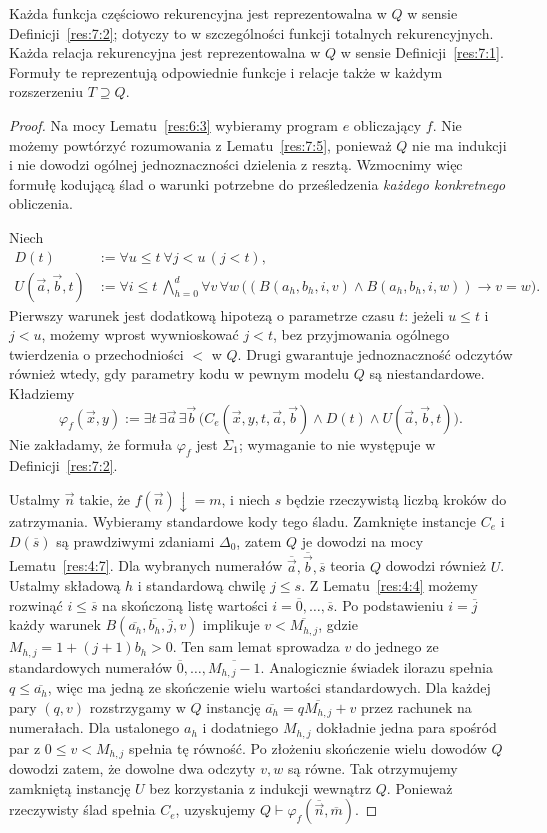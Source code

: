 \begin{twierdzenie}\label{res:7:6}
Każda funkcja częściowo rekurencyjna jest reprezentowalna w $Q$ w sensie Definicji~\ref{res:7:2}; dotyczy to w szczególności funkcji totalnych rekurencyjnych. Każda relacja rekurencyjna jest reprezentowalna w $Q$ w sensie Definicji~\ref{res:7:1}. Formuły te reprezentują odpowiednie funkcje i relacje także w każdym rozszerzeniu $T\supseteq Q$.
\end{twierdzenie}
\begin{proof}
Na mocy Lematu~\ref{res:6:3} wybieramy program $e$ obliczający $f$. Nie możemy powtórzyć rozumowania z Lematu~\ref{res:7:5}, ponieważ $Q$ nie ma indukcji i nie dowodzi ogólnej jednoznaczności dzielenia z resztą. Wzmocnimy więc formułę kodującą ślad o warunki potrzebne do prześledzenia \emph{każdego konkretnego} obliczenia.

Niech
\begin{align*}
D(t)&:=\forall u\le t\ \forall j<u\,(j<t),\\
U(\vec a,\vec b,t)&:=\forall i\le t\ \bigwedge_{h=0}^d\forall v\,\forall w\,
\bigl((B(a_h,b_h,i,v)\land B(a_h,b_h,i,w))\to v=w\bigr).
\end{align*}
Pierwszy warunek jest dodatkową hipotezą o parametrze czasu $t$:
jeżeli $u\le t$ i $j<u$, możemy wprost wywnioskować $j<t$,
bez przyjmowania ogólnego twierdzenia o przechodniości $<$ w $Q$.
Drugi gwarantuje jednoznaczność odczytów również wtedy,
gdy parametry kodu w pewnym modelu $Q$ są niestandardowe. Kładziemy
\[
\varphi_f(\vec x,y):=\exists t\,\exists\vec a\,\exists\vec b\,
\bigl(C_e(\vec x,y,t,\vec a,\vec b)\land D(t)\land U(\vec a,\vec b,t)\bigr).
\]
Nie zakładamy, że formuła $\varphi_f$ jest $\Sigma_1$; wymaganie to nie występuje w Definicji~\ref{res:7:2}.

Ustalmy $\vec n$ takie, że $f(\vec n)\downarrow=m$, i niech $s$ będzie rzeczywistą liczbą kroków do zatrzymania. Wybieramy standardowe kody tego śladu. Zamknięte instancje $C_e$ i $D(\overline s)$ są prawdziwymi zdaniami $\Delta_0$, zatem $Q$ je dowodzi na mocy Lematu~\ref{res:4:7}. Dla wybranych numerałów $\overline{\vec a},\overline{\vec b},\overline s$
teoria $Q$ dowodzi również $U$. Ustalmy składową $h$ i
standardową chwilę $j\le s$. Z Lematu~\ref{res:4:4} możemy
rozwinąć $i\le\overline s$ na skończoną listę wartości
$i=\overline0,\ldots,\overline s$. Po podstawieniu
$i=\overline j$ każdy warunek
$B(\overline{a_h},\overline{b_h},\overline j,v)$ implikuje
$v<\overline{M_{h,j}}$, gdzie $M_{h,j}=1+(j+1)b_h>0$.
Ten sam lemat sprowadza $v$ do jednego ze standardowych
numerałów $\overline0,\ldots,\overline{M_{h,j}-1}$.
Analogicznie świadek ilorazu spełnia $q\le\overline{a_h}$,
więc ma jedną ze skończenie wielu wartości standardowych.
Dla każdej pary $(q,v)$ rozstrzygamy w $Q$ instancję
$\overline{a_h}=q\overline{M_{h,j}}+v$ przez rachunek na
numerałach. Dla ustalonego $a_h$ i dodatniego $M_{h,j}$
dokładnie jedna para spośród par z $0\le v<M_{h,j}$
spełnia tę równość. Po złożeniu skończenie wielu dowodów
$Q$ dowodzi zatem, że dowolne dwa odczyty $v,w$ są równe.
Tak otrzymujemy zamkniętą instancję $U$ bez korzystania
z indukcji wewnątrz $Q$. Ponieważ rzeczywisty ślad spełnia
$C_e$, uzyskujemy $Q\vdash\varphi_f(\overline{\vec n},\overline m)$.


\end{proof}
